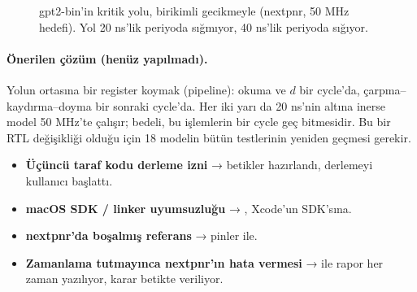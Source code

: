 \begin{figure}[htb]
\centering
{}
\caption{gpt2-bin'in kritik yolu, birikimli gecikmeyle (nextpnr, 50 MHz hedefi). Yol 20 ns'lik periyoda sığmıyor, 40 ns'lik periyoda sığıyor.}
\label{fig:kritik}
\end{figure}

\paragraph{Önerilen çözüm (henüz yapılmadı).} Yolun ortasına bir register koymak (pipeline): okuma ve $d$ bir cycle'da, çarpma–kaydırma–doyma bir sonraki cycle'da. Her iki yarı da 20 ns'nin altına inerse model 50 MHz'te çalışır; bedeli, bu işlemlerin bir cycle geç bitmesidir. Bu bir RTL değişikliği olduğu için 18 modelin bütün testlerinin yeniden geçmesi gerekir.

\sorunlar
\begin{itemize}
  \item \textbf{Üçüncü taraf kodu derleme izni} → betikler hazırlandı, derlemeyi kullanıcı başlattı.
  \item \textbf{macOS SDK / linker uyumsuzluğu} → , Xcode'un SDK'sına.
  \item \textbf{nextpnr'da boşalmış referans} → pinler  ile.
  \item \textbf{Zamanlama tutmayınca nextpnr'ın hata vermesi} →  ile rapor her zaman yazılıyor, karar betikte veriliyor.
\end{itemize}

